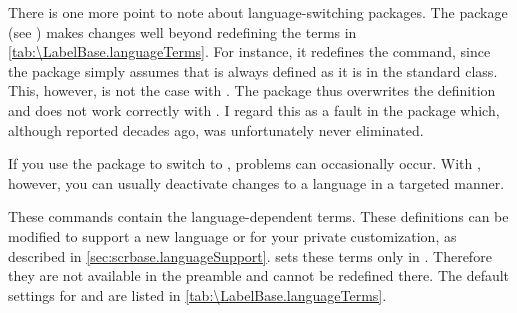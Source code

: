 There is one more point to note about language-switching
packages. The
 package (see
\cite{package:french}) makes changes well beyond redefining the terms in
\autoref{tab:\LabelBase.languageTerms}. For instance, it redefines the
 command, since the package simply assumes that
 is always defined as it is in the standard
 class. This, however, is not the case with \KOMAScript{}. The
 package thus overwrites the definition and does not work
correctly with \KOMAScript. I regard this as a fault in the 
package which, although reported decades ago, was unfortunately never
eliminated.

If you use the  package to switch to
, problems can occasionally occur. With ,
however, you can usually deactivate changes to a language in a targeted
manner.%


\begin{Declaration}
\end{Declaration}
These commands contain the language-dependent terms. These definitions can be
modified to support a new language or for your private customization, as
described in
\autoref{sec:scrbase.languageSupport}. \KOMAScript{} sets these terms only in
. Therefore they are not available in the
preamble and cannot be redefined there. The default settings for
 and  are listed in
\autoref{tab:\LabelBase.languageTerms}.%
\EndIndexGroup

